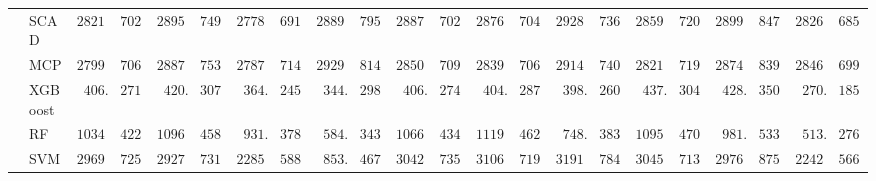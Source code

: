 \begin{tabular}{p{0.2cm}p{1cm}|p{0.6cm}p{0.6cm}|p{0.6cm}p{0.6cm}p{0.6cm}p{0.6cm}p{0.6cm}p{0.6cm}|p{0.6cm}p{0.6cm}p{0.6cm}p{0.6cm}p{0.6cm}p{0.6cm}|p{0.6cm}p{0.6cm}p{0.6cm}p{0.6cm}p{0.6cm}p{0.6cm}}
 & SCAD  & $2821.62$ & $702.21$ & $2895.28$ & $749.72$ & $2778.52$ & $691.05$ & $2889.99$ & $795.63$ & $2887.97$ & $702.88$ & $2876.96$ & $704.22$ & $2928.42$ & $736.85$ & $2859.75$ & $720.21$ & $2899.14$ & $847.80$ & $2826.62$ & $685.76$ \\
 & MCP  & $2799.40$ & $706.73$ & $2887.96$ & $753.82$ & $2787.77$ & $714.04$ & $2929.79$ & $814.19$ & $2850.15$ & $709.51$ & $2839.83$ & $706.98$ & $2914.90$ & $740.99$ & $2821.11$ & $719.29$ & $2874.97$ & $839.09$ & $2846.78$ & $699.95$ \\
 & XGBoost  & $\phantom{0}406.09$ & $271.79$ & $\phantom{0}420.99$ & $307.56$ & $\phantom{0}364.75$ & $245.11$ & $\phantom{0}344.49$ & $298.76$ & $\phantom{0}406.84$ & $274.39$ & $\phantom{0}404.35$ & $287.00$ & $\phantom{0}398.90$ & $260.85$ & $\phantom{0}437.19$ & $304.72$ & $\phantom{0}428.11$ & $350.26$ & $\phantom{0}270.63$ & $185.45$ \\
 & RF  & $1034.77$ & $422.05$ & $1096.10$ & $458.02$ & $\phantom{0}931.69$ & $378.13$ & $\phantom{0}584.70$ & $343.09$ & $1066.04$ & $434.42$ & $1119.44$ & $462.41$ & $\phantom{0}748.68$ & $383.72$ & $1095.63$ & $470.63$ & $\phantom{0}981.70$ & $533.17$ & $\phantom{0}513.48$ & $276.57$ \\
 & SVM  & $2969.59$ & $725.72$ & $2927.46$ & $731.24$ & $2285.71$ & $588.44$ & $\phantom{0}853.28$ & $467.23$ & $3042.26$ & $735.78$ & $3106.35$ & $719.42$ & $3191.85$ & $784.46$ & $3045.24$ & $713.01$ & $2976.76$ & $875.66$ & $2242.13$ & $566.79$ \\
\hline 
\end{tabular}

